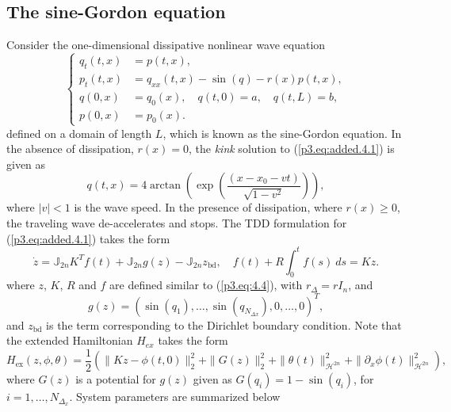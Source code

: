 \subsection{The sine-Gordon equation}
Consider the one-dimensional dissipative nonlinear wave equation
\begin{equation} \label{p3.eq:added.4.1}
	\left\{
	\begin{aligned}
		q_{t}(t,x) &= p(t,x), \\
		p_{t}(t,x) &= q_{xx}(t,x) - \sin(q) - r(x)  p(t,x), \\
		q(0,x) &= q_0(x), \quad q(t,0) = a, \quad q(t,L) = b,\\
		p(0,x) &= p_0(x).
	\end{aligned}
	\right.
\end{equation}
defined on a domain of length $L$, which is known as the sine-Gordon equation. In the absence of dissipation, $r(x) = 0$, the \emph{kink} solution to (\ref{p3.eq:added.4.1}) is given as
\begin{equation} \label{p3.eq:added.4.2}
	q(t,x) = 4\arctan\left( \exp \left( \frac{(x-x_0 - vt)}{\sqrt{1-v^2}} \right) \right),
\end{equation}
where $|v|< 1$ is the wave speed. In the presence of dissipation, where $r(x)\geq 0$, the traveling wave de-accelerates and stops. The TDD formulation for (\ref{p3.eq:added.4.1}) takes the form
\begin{equation} \label{p3.eq:added.4.3}
	\dot z = \mathbb J_{2n} K^T f(t) + \mathbb J_{2n} g(z) - \mathbb J_{2n} z_{\text{bd}}, \quad f(t) + R \int_0^t f(s) \ ds = K z.	
\end{equation}
where $z$, $K$, $R$ and $f$ are defined similar to (\ref{p3.eq:4.4}), with $r_{\Delta} = rI_{n}$, and 
\begin{equation}
g(z) = (\sin(q_1),\dots,\sin(q_{N_{\Delta x}}),0,\dots,0)^T,
\end{equation}
and $z_{\text{bd}}$ is the term corresponding to the Dirichlet boundary condition. Note that the extended Hamiltonian $H_{ex}$ takes the form
\begin{equation}
	H_\text{ex}(z,\phi,\theta) = \frac 1 2 \left( \| Kz - \phi(t,0) \|_2^2 + \| G(z) \|_2^2 + \| \theta(t) \|^2_{\mathcal H^{2n} } + \| \partial_x\phi(t)\|^2_{\mathcal H^{2n} }\right),
\end{equation}
where $G(z)$ is a potential for $g(z)$ given as $G(q_i) = 1 - \sin(q_i)$, for $i=1,\dots,N_{\Delta_x}$. System parameters are summarized below

